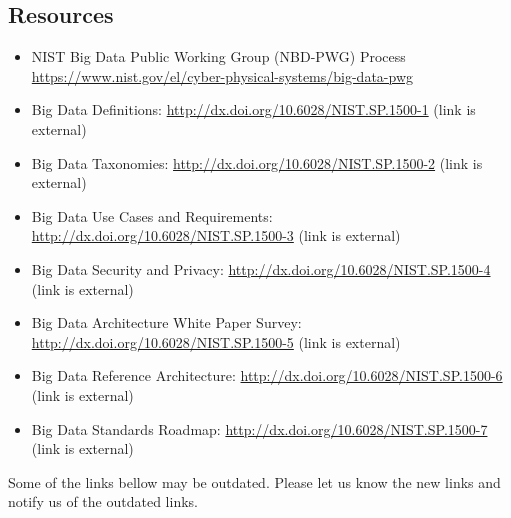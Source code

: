 



\subsection{Resources}

\begin{itemize}
\item
  NIST Big Data Public Working Group (NBD-PWG) Process
  \url{https://www.nist.gov/el/cyber-physical-systems/big-data-pwg}
\item
  Big Data Definitions: \url{http://dx.doi.org/10.6028/NIST.SP.1500-1}
  (link is external)
\item
  Big Data Taxonomies: \url{http://dx.doi.org/10.6028/NIST.SP.1500-2}
  (link is external)
\item
  Big Data Use Cases and Requirements:
  \url{http://dx.doi.org/10.6028/NIST.SP.1500-3} (link is external)
\item
  Big Data Security and Privacy:
  \url{http://dx.doi.org/10.6028/NIST.SP.1500-4} (link is external)
\item
  Big Data Architecture White Paper Survey:
  \url{http://dx.doi.org/10.6028/NIST.SP.1500-5} (link is external)
\item
  Big Data Reference Architecture:
  \url{http://dx.doi.org/10.6028/NIST.SP.1500-6} (link is external)
\item
  Big Data Standards Roadmap:
  \url{http://dx.doi.org/10.6028/NIST.SP.1500-7} (link is external)
\end{itemize}

Some of the links bellow may be outdated. Please let us know the new
links and notify us of the outdated links.



